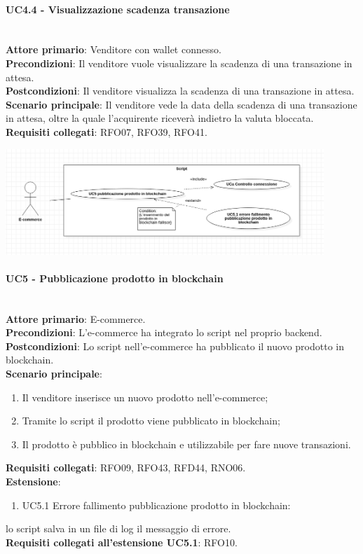 \documentclass[a4paper, 12pt]{article}
\begin{document}
\paragraph{UC4.4 - Visualizzazione scadenza transazione}\\
\textbf{Attore primario}: Venditore  con wallet connesso.\\
\textbf{Precondizioni}: Il venditore vuole visualizzare la scadenza di una transazione in attesa.\\
\textbf{Postcondizioni}: Il venditore visualizza la scadenza di una transazione in attesa.\\
\textbf{Scenario principale}: Il venditore vede la data della scadenza di una transazione in attesa, oltre la quale l'acquirente riceverà indietro la valuta bloccata.\\
\textbf{Requisiti collegati}: RFO07, RFO39, RFO41.

\includegraphics[width=0.9\textwidth]{UC_script}


\paragraph{UC5 - Pubblicazione prodotto in blockchain}\\
\textbf{Attore primario}: E-commerce.\\
\textbf{Precondizioni}: L'e-commerce ha integrato lo script nel proprio backend.\\
\textbf{Postcondizioni}: Lo script nell'e-commerce ha pubblicato il nuovo prodotto in blockchain.\\
\textbf{Scenario principale}:
\begin{enumerate}
    \item Il venditore inserisce un nuovo prodotto nell'e-commerce;
    \item Tramite lo script il prodotto viene pubblicato in blockchain;
    \item Il prodotto è pubblico in blockchain e utilizzabile per fare nuove transazioni.
\end{enumerate}
\textbf{Requisiti collegati}: RFO09, RFO43, RFD44, RNO06.\\
\textbf{Estensione}:
\begin{enumerate}
    \item UC5.1 Errore fallimento pubblicazione prodotto in blockchain:\\
\end{enumerate}
lo script salva in un file di log il messaggio di errore.\\
\textbf{Requisiti collegati all'estensione UC5.1}: RFO10.
\end{document}
